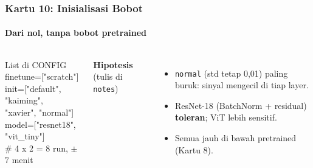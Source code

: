 \documentclass[t,aspectratio=169,xcolor={dvipsnames,table}]{beamer}
\begin{document}
\begin{frame}
    \frametitle{Kartu 10: Inisialisasi Bobot}
    \framesubtitle{Dari nol, tanpa bobot pretrained}
    \footnotesize

    \begin{columns}[T]
        \begin{block}{List di CONFIG}
            {\ttfamily\scriptsize finetune=["scratch"]\\init=["default", "kaiming",\\\hspace*{2.6em}"xavier", "normal"]\\model=["resnet18", "vit\_tiny"]\\\# 4 x 2 = 8 run, $\pm$7 menit}
        \end{block}
        \textbf{Hipotesis} (tulis di \texttt{notes})
        \begin{itemize}
            \item \texttt{normal} (std tetap 0,01) paling buruk: sinyal mengecil di tiap layer.
            \item ResNet-18 (BatchNorm + residual) \textbf{toleran}; ViT lebih sensitif.
            \item Semua jauh di bawah pretrained (Kartu 8).
        \end{itemize}


\end{columns}
\end{frame}
\end{document}
